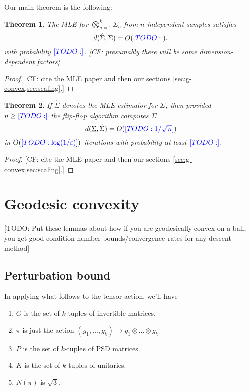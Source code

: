 \documentclass{article}
\newtheorem{theorem}{Theorem}
\newcommand{\ot}{\otimes}
\newcommand\eps{\varepsilon}
\newcommand{\CF}[1]{{\color{purple}[CF: #1]}}
\newcommand{\TODO}[1]{{\color{blue}[TODO: #1]}}
\begin{document}
Our main theorem is the following:

\begin{theorem} The MLE for $\bigotimes_{a = 1}^{k} \Sigma_a$ from $n$ independent samples satisfies 
$$ d(\hat{\Sigma}, \Sigma) = O(\TODO{}). $$
with probability $\TODO{}$.
\CF{presumably there will be some dimension-dependent factors}.
\end{theorem}

\begin{proof}
\CF{cite the MLE paper and then our sections \cref{sec:g-convex,sec:scaling}.}
\end{proof}

\begin{theorem} If $\hat{\Sigma}$ denotes the MLE estimator for $\Sigma$, then provided $n \geq \TODO{}$ the flip-flop algorithm computes $\underline{\Sigma}$ 
$$ d(\underline{\Sigma}, \hat{\Sigma}) = O(\TODO{1/\sqrt{n}}) $$
in $O(\TODO{\log(1/\eps)})$ iterations with probability at least $\TODO{}$.
\end{theorem}

\begin{proof}
\CF{cite the MLE paper and then our sections \cref{sec:g-convex,sec:scaling}.}
\end{proof}



\section{Geodesic convexity}\label{sec:g-convex}
\TODO{Put these lemmas about how if you are geodesically convex on a ball, you get good condition number bounds/convergence rates for any descent method}

\subsection{Perturbation bound}
In applying what follows to the tensor action, we'll have
\begin{enumerate}
\item $G$ is the set of $k$-tuples of invertible matrices. 
\item $\pi$ is just the action $(g_1, \dots, g_k) \to g_1 \ot \dots \ot g_k$
\item $P$ is the set of $k$-tuples of PSD matrices.
\item $K$ is the set of $k$-tuples of unitaries.
\item $N(\pi)$ is $\sqrt{3}$.
\end{enumerate}
\end{document}

